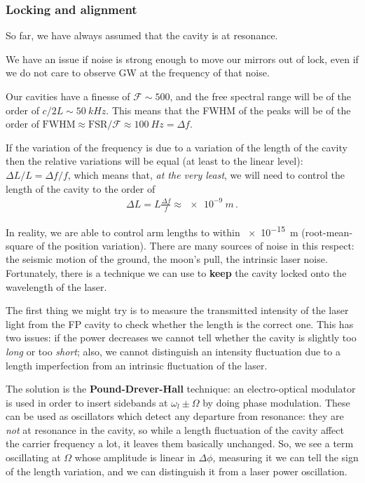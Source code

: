 \documentclass[main.tex]{subfiles}
\begin{document}
\subsubsection{Locking and alignment}

So far, we have always assumed that the cavity is at resonance. 


We have an issue if noise is strong enough to move our mirrors out of lock, even if we do not care to observe GW at the frequency of that noise.

Our cavities have a finesse of \(\mathcal{F} \sim 500\), and the free spectral range will be of the order of \(c / 2L \sim \SI{50}{kHz}\). 
This means that the FWHM of the peaks will be of the order of \(\text{FWHM} \approx \text{FSR} / \mathcal{F} \approx \SI{100}{Hz} = \Delta f\).

If the variation of the frequency is due to a variation of the length of the cavity then the relative variations will be equal (at least to the linear level): \(\Delta L / L = \Delta f / f\), which means that, \emph{at the very least}, we will need to control the length of the cavity to the order of 
%
\begin{align}
\Delta L = L \frac{ \Delta f}{f} \approx \SI{e-9}{m}
\,.
\end{align}

In reality, we are able to control arm lengths to within \SI{e-15}{m} (root-mean-square of the position variation). 
There are many sources of noise in this respect: the seismic motion of the ground, the moon's pull, the intrinsic laser noise. 
Fortunately, there is a technique we can use to \textbf{keep} the cavity locked onto the wavelength of the laser. 

The first thing we might try is to measure the transmitted intensity of the laser light from the FP cavity to check whether the length is the correct one.
This has two issues: if the power decreases we cannot tell whether the cavity is slightly too \emph{long} or too \emph{short}; also, we cannot distinguish an intensity fluctuation due to a length imperfection from an intrinsic fluctuation of the laser. 

The solution is the \textbf{Pound-Drever-Hall} technique: an electro-optical modulator is used in order to insert sidebands at \(\omega_{l} \pm \Omega \) by doing phase modulation. 
These can be used as oscillators which detect any departure from resonance: they are \emph{not} at resonance in the cavity, so while a length fluctuation of the cavity affect the carrier frequency a lot, it leaves them basically unchanged. 
So, we see a term oscillating at \(\Omega \) whose amplitude is linear in \(\Delta \phi \), measuring it we can tell the sign of the length variation, and we can distinguish it from a laser power oscillation. 
\end{document}
